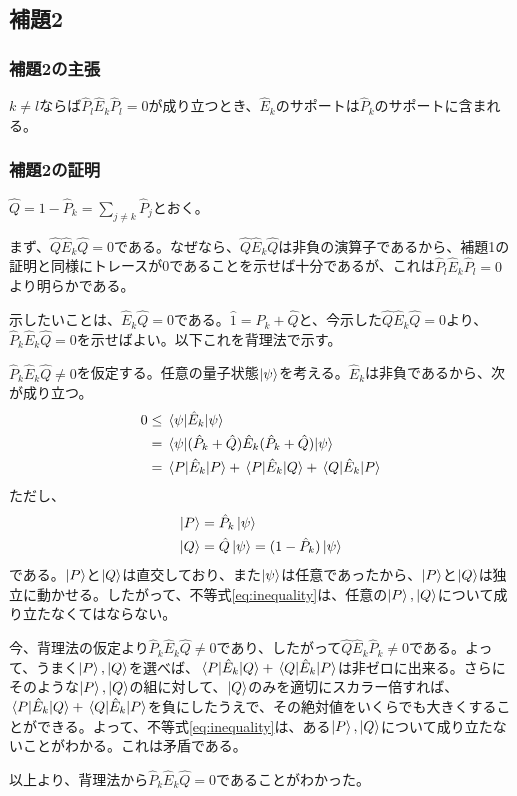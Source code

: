 \documentclass[uplatex,dvipdfmx, a4j]{jsarticle}
\newcommand{\ope}[1]{\hat{#1}}
\newcommand{\proj}{\ope{P}}
\begin{document}
\subsection{補題2}
\subsubsection{補題2の主張}
$k\neq l$ならば$\proj_l\ope{E}_k\proj_l = 0$が成り立つとき、$\ope{E}_k$のサポートは$\proj_k$のサポートに含まれる。
\subsubsection{補題2の証明}
$\ope{Q} = 1-\proj_k = \sum_{j\neq k} \proj_j$とおく。

まず、$\ope{Q}\ope{E}_k\ope{Q} = 0$である。なぜなら、$\ope{Q}\ope{E}_k\ope{Q}$は非負の演算子であるから、補題1の証明と同様にトレースが0であることを示せば十分であるが、これは$\proj_l\ope{E}_k\proj_l = 0$より明らかである。

示したいことは、$\ope{E}_k\ope{Q}=0$である。$\ope{1} = \proj_k + \ope{Q}$と、今示した$\ope{Q}\ope{E}_k\ope{Q} = 0$より、 $\proj_k \ope{E}_k \ope{Q}=0$を示せばよい。以下これを背理法で示す。

$\proj_k \ope{E}_k \ope{Q}\neq0$を仮定する。任意の量子状態$\ket{\psi}$を考える。$\ope{E}_k$は非負であるから、次が成り立つ。
\begin{align}
	0 &\le \expval*{\ope{E}_k}{\psi} \\
	  &= \matrixelement*{\psi}{(\proj_k + \ope{Q})\ope{E}_k(\proj_k + \ope{Q})}{\psi} \\
	  &= \matrixelement*{P}{\ope{E}_k}{P} + \matrixelement*{P}{\ope{E}_k}{Q} + \matrixelement*{Q}{\ope{E}_k}{P} \label{eq:inequality}
\end{align}
ただし、
\begin{align}
	\ket{P} &= \proj_k \ket{\psi} \\
	\ket{Q} &= \ope{Q} \ket{\psi} = (1-\proj_k) \ket{\psi}
\end{align}
である。$\ket{P}$と$\ket{Q}$は直交しており、また$\ket{\psi}$は任意であったから、$\ket{P}$と$\ket{Q}$は独立に動かせる。したがって、不等式\eqref{eq:inequality}は、任意の$\ket{P},\ket{Q}$について成り立たなくてはならない。

今、背理法の仮定より$\proj_k \ope{E}_k \ope{Q}\neq0$であり、したがって$\ope{Q}\ope{E}_k\proj_k\neq0$である。よって、うまく$\ket{P},\ket{Q}$を選べば、$\matrixelement*{P}{\ope{E}_k}{Q} + \matrixelement*{Q}{\ope{E}_k}{P}$は非ゼロに出来る。さらにそのような$\ket{P},\ket{Q}$の組に対して、$\ket{Q}$のみを適切にスカラー倍すれば、$\matrixelement*{P}{\ope{E}_k}{Q} + \matrixelement*{Q}{\ope{E}_k}{P}$を負にしたうえで、その絶対値をいくらでも大きくすることができる。よって、不等式\eqref{eq:inequality}は、ある$\ket{P},\ket{Q}$について成り立たないことがわかる。これは矛盾である。

以上より、背理法から$\proj_k \ope{E}_k \ope{Q}=0$であることがわかった。
\end{document}
